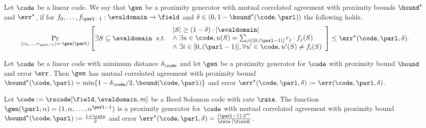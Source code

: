 \begin{definition}\label{def:gen_mutual_corr_agreement}
    Let $\code$ be a linear code. We say that $\gen$ be a proximity generator with mutual correlated agreement with proximity bounds ${\bound}^\star$ and $\err^\star$, if for $f_0,\ldots,f_{\parl-1}:\evaldomain\rightarrow\field$ and $\delta\in(0,1-{\bound}^\star(\code,\parl))$ the following holds.
    \[
    \Pr_{(r_0, \ldots, r_{\parl-1}) \leftarrow \gen(\parl)} \left[
        \exists S \subseteq \evaldomain \;\; s.t.\;\;
        \begin{array}{l}
        |S| \geq (1 - \delta) \cdot |\evaldomain| \\
        \land\; \exists u \in \code, u(S) = \sum_{j \in [0,(\parl-1)]} r_j \cdot f_j(S) \\
        \land\; \exists i \in [0,(\parl-1)], \forall u' \in \code, u'(S) \neq f_i(S)
        \end{array}\right]
    \leq \err^\star(\code, \parl, \delta).
    \]
\end{definition}

\begin{lemma}\label{lemma:gen_mutual_corr_agreement}
    Let $\code$ be a linear code with minimum distance $\delta_{\code}$ and let $\gen$ be a proximity generator for $\code$ with proximity bound ${\bound}$ and error $\err$. Then $\gen$ has mutual correlated agreement with proximity bound ${\bound}^\star(\code, \parl) = \min\{1 - \delta_{\code}/2, \bound(\code, \parl)\}$ and error $\err^\star(\code, \parl, \delta) := \err(\code, \parl, \delta)$.
\end{lemma}

\begin{lemma}
    Let $\code := \rscode[\field, \evaldomain, m]$ be a Reed Solomon code with rate $\rate$. The function $\gen(\parl; \alpha) = (1, \alpha, \ldots, \alpha^{\parl - 1})$ is a proximity generator for $\code$ with mutual correlated agreement with proximity bound ${\bound}^\star(\code, \parl) := \frac{1 + \rate}{2}$ and error $\err^\star(\code, \parl, \delta) = \frac{(\parl - 1) \cdot 2^m}{\rate \cdot |\field|}$.
\end{lemma}

